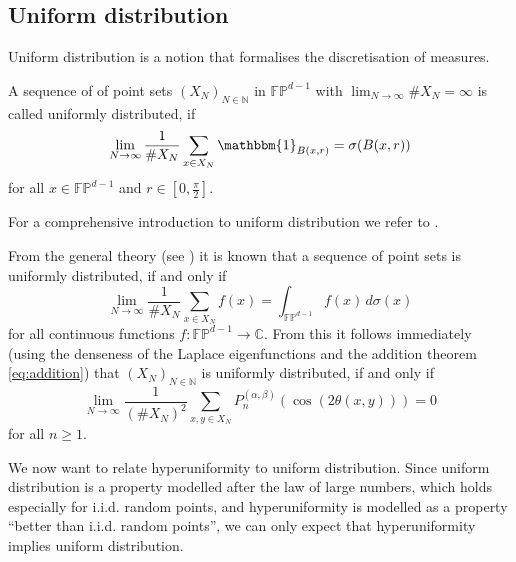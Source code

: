 \subsection{Uniform distribution}\label{sec:uniform-distribution}
Uniform distribution is a notion that formalises the discretisation of
measures.
\begin{definition}
  A sequence of of point sets $(X_N)_{N\in\mathbb{N}}$ in $\mathbb{FP}^{d-1}$
  with $\lim_{N\to\infty}\#X_N=\infty$ is called uniformly distributed, if
  \begin{equation*}
    \lim_{N\to\infty}\frac1{\#X_N}\sum_{x\in
      X_N}\mathbbm{1}_{B(x,r)}=\sigma(B(x,r))
  \end{equation*}
  for all $x\in \mathbb{FP}^{d-1}$ and $r\in[0,\frac\pi2]$.
\end{definition}
For a comprehensive introduction to uniform distribution we refer to
\cite{Drmota_Tichy1997:sequences_discrepancies_applications,
  Kuipers_Niederreiter1974:uniform_distribution_sequences}.

From the general theory (see
\cite{Kuipers_Niederreiter1974:uniform_distribution_sequences}) it is known
that a sequence of point sets is uniformly distributed, if and only if
\begin{equation*}
  \lim_{N\to\infty}\frac1{\#X_N}\sum_{x\in X_N}f(x)=
  \int_{\mathbb{FP}^{d-1}}f(x)\,d\sigma(x)
\end{equation*}
for all continuous functions $f:\mathbb{FP}^{d-1}\to\mathbb{C}$. From this it
follows immediately (using the denseness of the Laplace eigenfunctions and the
addition theorem \eqref{eq:addition}) that $(X_N)_{N\in\mathbb{N}}$ is
uniformly distributed, if and only if
\begin{equation}\label{eq:Weyl}
  \lim_{N\to\infty}\frac1{(\#X_N)^2}\sum_{x,y\in X_N}P_n^{(\alpha,\beta)}
  (\cos(2\theta(x,y)))=0
\end{equation}
for all $n\geq1$.

We now want to relate hyperuniformity to uniform distribution. Since uniform
distribution is a property modelled after the law of large numbers, which holds
especially for i.i.d. random points, and hyperuniformity is modelled as a
property ``better than i.i.d. random points'', we can only expect that
hyperuniformity implies uniform distribution.

